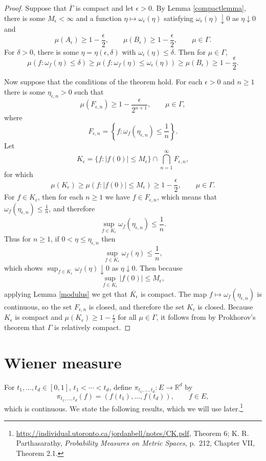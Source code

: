 \documentclass{article}
\theoremstyle{definition}
\begin{document}
\begin{proof}
Suppose that $\overline{\Gamma}$ is compact and let $\epsilon>0$.
By Lemma \ref{compactlemma}, there is some $M_\epsilon<\infty$ and a function $\eta \mapsto \omega_\epsilon(\eta)$
satisfying $\omega_\epsilon(\eta) \downarrow 0$ as $\eta \downarrow 0$ and
\[
\mu(A_\epsilon) \geq 1-\frac{\epsilon}{2},\qquad \mu(B_\epsilon) \geq 1-\frac{\epsilon}{2},
\qquad \mu \in \Gamma.
\]
For $\delta>0$, there is some $\eta = \eta(\epsilon,\delta)$ with $\omega_\epsilon(\eta) \leq \delta$. Then for
$\mu \in \Gamma$,
\[
\mu(f : \omega_f(\eta) \leq \delta) \geq 
\mu(f : \omega_f(\eta) \leq \omega_\epsilon(\eta))
\geq \mu(B_\epsilon)
\geq 1-\frac{\epsilon}{2}.
\]

Now suppose that the conditions of the theorem hold. For  each $\epsilon>0$ and $n \geq 1$ there is some
$\eta_{\epsilon,n}>0$ such that 
\[
\mu(F_{\epsilon,n}) \geq 1-\frac{\epsilon}{2^{n+1}},\qquad \mu \in \Gamma,
\]
where
\[
F_{\epsilon,n} = \left\{f : \omega_f(\eta_{\epsilon,n}) \leq \frac{1}{n}\right\}.
\]
Let
\[
K_\epsilon = \{f : |f(0)| \leq M_\epsilon\} \cap \bigcap_{n=1}^\infty F_{\epsilon,n},
\]
for which
\[
\mu(K_\epsilon) \geq \mu(f : |f(0)| \leq M_\epsilon) \geq 1-\frac{\epsilon}{2},\qquad \mu \in \Gamma.
\]
For $f \in K_\epsilon$, then for each $n \geq 1$ we have $f \in F_{\epsilon,n}$, which means that
$\omega_f(\eta_{\epsilon,n}) \leq \frac{1}{n}$, and therefore
\[
\sup_{f \in K_\epsilon} \omega_f(\eta_{\epsilon,n}) \leq \frac{1}{n}.
\]
Thus for $n \geq 1$, if $0<\eta \leq \eta_{\epsilon,n}$ then
\[
\sup_{f \in K_\epsilon} \omega_f(\eta) \leq \frac{1}{n},
\]
which shows $\sup_{f \in K_\epsilon} \omega_f(\eta) \downarrow 0$ as $\eta \downarrow 0$. 
Then because
\[
\sup_{f \in K_\epsilon} |f(0)| \leq M_\epsilon,
\]
applying Lemma \ref{modulus} we get that $\overline{K_\epsilon}$ is compact. The map
$f \mapsto \omega_f(\eta_{\epsilon,n})$ is continuous, so the set $F_{\epsilon,n}$ is closed, and therefore
the set $K_\epsilon$ is closed.  
Because $K_\epsilon$ is compact and $\mu(K_\epsilon) \geq 1-\frac{\epsilon}{2}$ for all
$\mu \in \Gamma$, it follows from
by Prokhorov's theorem that  $\Gamma$ is relatively compact. 
\end{proof}



\section{Wiener measure}
For $t_1,\ldots,t_d \in [0,1]$, $t_1<\cdots<t_d$, 
define $\pi_{t_1,\ldots,t_d}:E \to \mathbb{R}^d$ by 
\[
\pi_{t_1,\ldots,t_d}(f) = (f(t_1),\ldots,f(t_d)),\qquad f \in E,
\]
which is continuous. We state the following results, which we will use later.\footnote{\url{http://individual.utoronto.ca/jordanbell/notes/CK.pdf}, Theorem 6;
K. R.
Parthasarathy, {\em Probability Measures on Metric Spaces}, p.~212, Chapter VII, Theorem 2.1.}
\end{document}
